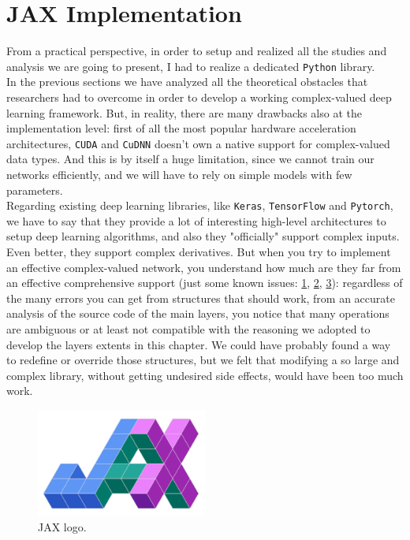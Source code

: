 \documentclass[../main.tex]{subfiles}
\begin{document}
\section{JAX Implementation}

From a practical perspective, in order to setup and realized all the studies and analysis we are going to present, I had to realize a dedicated \texttt{Python} library.\\
In the previous sections we have analyzed all the theoretical obstacles that researchers had to overcome in order to develop a working complex-valued deep learning framework. But, in reality, there are many drawbacks also at the implementation level: first of all the most popular hardware acceleration architectures, \texttt{CUDA} and \texttt{CuDNN} doesn't own a native support for complex-valued data types. And this is by itself a huge limitation, since we cannot train our networks efficiently, and we will have to rely on simple models with few parameters.\\
Regarding existing deep learning libraries, like \texttt{Keras}, \texttt{TensorFlow} and \texttt{Pytorch}, we have to say that they provide a lot of interesting high-level architectures to setup deep learning algorithms, and also they "officially" support complex inputs. Even better, they support complex derivatives. But when you try to implement an effective complex-valued network, you understand how much are they far from an effective comprehensive support (just some known issues: \href{https://github.com/pytorch/pytorch/issues/33152}{1}, \href{https://github.com/tensorflow/tensorflow/issues/17097}{2}, \href{https://github.com/microsoft/tensorflow-directml/issues/32}{3}): regardless of the many errors you can get from structures that should work, from an accurate analysis of the source code of the main layers, you notice that many operations are ambiguous or at least not compatible with the reasoning we adopted to develop the layers extents in this chapter. We could have probably found a way to redefine or override those structures, but we felt that modifying a so large and complex library, without getting undesired side effects, would have been too much work.
\begin{figure}
	\includegraphics[width=0.5\textwidth]{pictures/JAX_logo.pdf}
	\caption{JAX logo.}
\end{figure}
\end{document}
